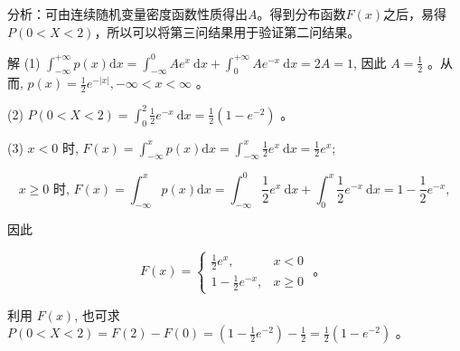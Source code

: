 \documentclass{beamer}
\begin{document}
	\begin{frame}
		分析：可由连续随机变量密度函数性质得出$A$。得到分布函数$F(x)$之后，易得$P(0 < X < 2)$，所以可以将第三问结果用于验证第二问结果。
		
		\vspace*{0.5cm}
		解 (1) $\int_{-\infty}^{+\infty} p(x) \mathrm{d} x=\int_{-\infty}^{0} A e^{x} \mathrm{~d} x+\int_{0}^{+\infty} A e^{-x} \mathrm{~d} x=2 A=1$, 因此 $A=\frac{1}{2}$ 。从而, $p(x) = \frac{1}{2} e^{-|x|},-\infty<x<\infty$ 。
		
		(2) $P(0<X<2)=\int_{0}^{2} \frac{1}{2} e^{-x} \mathrm{~d} x=\frac{1}{2}\left(1-e^{-2}\right)$ 。
		
		(3) $x<0$ 时, $F(x)=\int_{-\infty}^{x} p(x) \mathrm{d} x=\int_{-\infty}^{x} \frac{1}{2} e^{x} \mathrm{~d} x=\frac{1}{2} e^{x}$;
		
		$$
		x \geqslant 0 \text { 时, } F(x)=\int_{-\infty}^{x} p(x) \mathrm{d} x=\int_{-\infty}^{0} \frac{1}{2} e^{x} \mathrm{~d} x+\int_{0}^{x} \frac{1}{2} e^{-x} \mathrm{~d} x=1-\frac{1}{2} e^{-x},
		$$
		
		因此
		
		$$
		F(x)=\left\{\begin{array}{ll}
			\frac{1}{2} e^{x}, & x<0 \\
			1-\frac{1}{2} e^{-x}, & x \geqslant 0
		\end{array}\right. \text { 。 }
		$$
		
		利用 $F(x)$, 也可求 $P(0<X<2)=F(2)-F(0)=\left(1-\frac{1}{2} e^{-2}\right)-\frac{1}{2}=\frac{1}{2}\left(1-e^{-2}\right)$ 。
	\end{frame}
	
\end{document}
